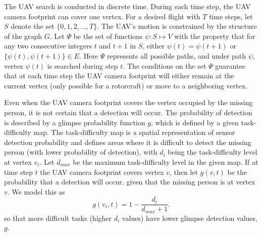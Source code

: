 The UAV search is conducted in discrete time. During each time step, the UAV camera footprint can cover one vertex. For a desired flight with $T$ time steps, let $S$ denote the set $\{0,1,2,...,T\}$. The UAV's motion is constrained by the structure of the graph $G$. Let $\Psi$ be the set of functions $\psi:S \mapsto V$ with the property that for any two consecutive integers $t$ and $t+1$ in $S$, either $\psi(t)=\psi(t+1)$ or $\{\psi(t),\psi(t+1)\}\in E$. Here $\Psi$ represents all possible paths, and under path $\psi$, vertex $\psi(t)$ is searched during step $t$. The conditions on the set $\Psi$ guarantee that at each time step the UAV camera footprint will either remain at the current vertex (only possible for a rotorcraft) or move to a neighboring vertex.

Even when the UAV camera footprint covers the vertex occupied by the missing person, it is not certain that a detection will occur. The probability of detection is described by a glimpse probability function $g$, which is defined by a given task-difficulty map. The task-difficulty map is a spatial representation of sensor detection probability and defines areas where it is difficult to detect the missing person (with lower probability of detection), with $d_i$ being the task-difficulty level at vertex $v_i$. Let $d_{max}$ be the maximum task-difficulty level in the given map. If at time step $t$ the UAV camera footprint covers vertex $v$, then let $g(v,t)$ be the probability that a detection will occur, given that the missing person is at vertex $v$. We model this as
\begin{equation}
g(v_i,t) = 1 - \frac{d_i}{d_{max}+1}.
\label{g}
\end{equation}
so that more difficult tasks (higher $d_i$ values) have lower glimpse detection values, $g$.

